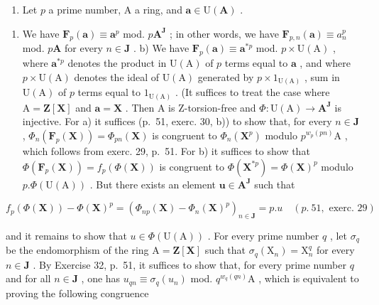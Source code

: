 \begin{enumerate}
\def\labelenumi{\arabic{enumi})}
\setcounter{enumi}{37}
\tightlist
\item
  Let \(p\) a prime number, A a ring, and \(\pmb{a} \in \mathrm{U}(\mathbf{A})\) .
\end{enumerate}

\begin{enumerate}
\def\labelenumi{\alph{enumi})}
\tightlist
\item
  We have \(\mathbf{F}_p(\boldsymbol{a}) \equiv \boldsymbol{a}^p\) mod. \(p\mathbf{A}^\mathbf{J}\) ; in other words, we have \(\mathbf{F}_{p,n}(\boldsymbol{a}) \equiv a_n^p\) mod. \(p\mathbf{A}\) for every \(n \in \mathbf{J}\) . b) We have \(\mathbf{F}_p(\boldsymbol{a}) \equiv \boldsymbol{a}^{*p}\) mod. \(p \times \mathrm{U(A)}\) , where \(\boldsymbol{a}^{*p}\) denotes the product in \(\mathrm{U(A)}\) of \(p\) terms equal to \(\boldsymbol{a}\) , and where \(p \times \mathrm{U(A)}\) denotes the ideal of \(\mathrm{U(A)}\) generated by \(p \times 1_{\mathrm{U(A)}}\) , sum in \(\mathrm{U(A)}\) of \(p\) terms equal to \(1_{\mathrm{U(A)}}\) . (It suffices to treat the case where \(\mathrm{A} = \mathbf{Z}[\mathbf{X}]\) and \(\boldsymbol{a} = \mathbf{X}\) . Then A is Z-torsion-free and \(\Phi: \mathrm{U(A)} \to \mathbf{A}^\mathbf{J}\) is injective. For a) it suffices (p.~51, exerc. 30, b)) to show that, for every \(n \in \mathbf{J}\) , \(\Phi_n(\mathbf{F}_p(\mathbf{X})) = \Phi_{pn}(\mathbf{X})\) is congruent to \(\Phi_n(\mathbf{X}^p)\) modulo \(p^{w_p(pn)}\mathrm{A}\) , which follows from exerc. 29, p.~51. For b) it suffices to show that \(\Phi(\mathbf{F}_p(\mathbf{X})) = f_p(\Phi(\mathbf{X}))\) is congruent to \(\Phi(\mathbf{X}^{*p}) = \Phi(\mathbf{X})^p\) modulo \(p.\Phi(\mathrm{U(A)})\) . But there exists an element \(\boldsymbol{u} \in \mathbf{A}^\mathbf{J}\) such that
\end{enumerate}

\[
f _ {p} (\Phi (\mathbf {X})) - \Phi (\mathbf {X}) ^ {p} = \left(\Phi_ {n p} (\mathbf {X}) - \Phi_ {n} (\mathbf {X}) ^ {p}\right) _ {n \in \mathbf {J}} = p. u \quad (p.~51, \text { exerc. } 2 9)
\]

  and it remains to show that \(u \in \Phi(\mathrm{U}(\mathrm{A}))\) . For every prime number \(q\) , let \(\sigma_q\) be the endomorphism of the ring \(\mathrm{A} = \mathbf{Z}[\mathbf{X}]\) such that \(\sigma_q(\mathrm{X}_n) = \mathrm{X}_n^q\) for every \(n \in \mathbf{J}\) . By Exercise 32, p.~51, it suffices to show that, for every prime number \(q\) and for all \(n \in \mathbf{J}\) , one has \(u_{qn} \equiv \sigma_q(u_n)\) mod. \(q^{w_q(qn)}\mathrm{A}\) , which is equivalent to proving the following congruence

